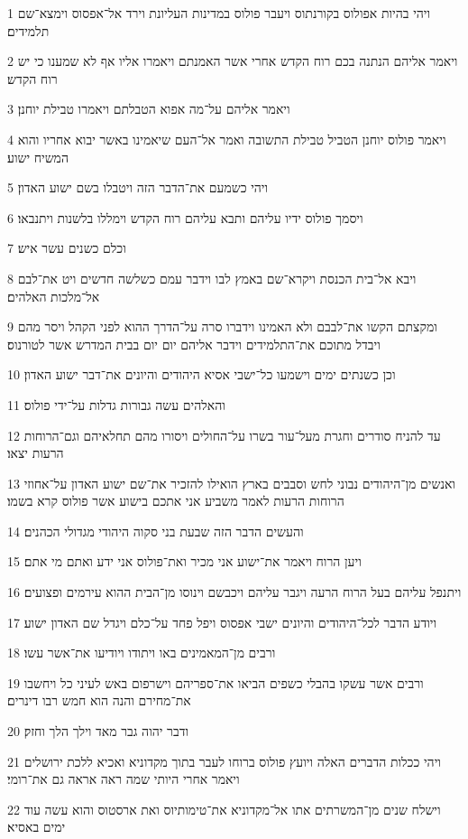 \par 1 ויהי בהיות אפולוס בקורנתוס ויעבר פולוס במדינות העליונת וירד אל־אפסוס וימצא־שם תלמידים׃
\par 2 ויאמר אליהם הנתנה בכם רוח הקדש אחרי אשר האמנתם ויאמרו אליו אף לא שמענו כי יש רוח הקדש׃
\par 3 ויאמר אליהם על־מה אפוא הטבלתם ויאמרו טבילת יוחנן׃
\par 4 ויאמר פולוס יוחנן הטביל טבילת התשובה ואמר אל־העם שיאמינו באשר יבוא אחריו והוא המשיח ישוע׃
\par 5 ויהי כשמעם את־הדבר הזה ויטבלו בשם ישוע האדון׃
\par 6 ויסמך פולוס ידיו עליהם ותבא עליהם רוח הקדש וימללו בלשנות ויתנבאו׃
\par 7 וכלם כשנים עשר איש׃
\par 8 ויבא אל־בית הכנסת ויקרא־שם באמץ לבו וידבר עמם כשלשה חדשים ויט את־לבם אל־מלכות האלהים׃
\par 9 ומקצתם הקשו את־לבבם ולא האמינו וידברו סרה על־הדרך ההוא לפני הקהל ויסר מהם ויבדל מתוכם את־התלמידים וידבר אליהם יום יום בבית המדרש אשר לטורנוס׃
\par 10 וכן כשנתים ימים וישמעו כל־ישבי אסיא היהודים והיונים את־דבר ישוע האדון׃
\par 11 והאלהים עשה גבורות גדלות על־ידי פולוס׃
\par 12 עד להניח סודרים וחגרת מעל־עור בשרו על־החולים ויסורו מהם תחלאיהם וגם־הרוחות הרעות יצאו׃
\par 13 ואנשים מן־היהודים נבוני לחש וסבבים בארץ הואילו להזכיר את־שם ישוע האדון על־אחוזי הרוחות הרעות לאמר משביע אני אתכם בישוע אשר פולוס קרא בשמו׃
\par 14 והעשים הדבר הזה שבעת בני סקוה היהודי מגדולי הכהנים׃
\par 15 ויען הרוח ויאמר את־ישוע אני מכיר ואת־פולוס אני ידע ואתם מי אתם׃
\par 16 ויתנפל עליהם בעל הרוח הרעה ויגבר עליהם ויכבשם וינוסו מן־הבית ההוא עירמים ופצועים׃
\par 17 ויודע הדבר לכל־היהודים והיונים ישבי אפסוס ויפל פחד על־כלם ויגדל שם האדון ישוע׃
\par 18 ורבים מן־המאמינים באו ויתודו ויודיעו את־אשר עשו׃
\par 19 ורבים אשר עשקו בהבלי כשפים הביאו את־ספריהם וישרפום באש לעיני כל ויחשבו את־מחירם והנה הוא חמש רבו דינרים׃
\par 20 ודבר יהוה גבר מאד וילך הלך וחזק׃
\par 21 ויהי ככלות הדברים האלה ויועץ פולוס ברוחו לעבר בתוך מקדוניא ואכיא ללכת ירושלים ויאמר אחרי היותי שמה ראה אראה גם את־רומי׃
\par 22 וישלח שנים מן־המשרתים אתו אל־מקדוניא את־טימותיוס ואת ארסטוס והוא עשה עוד ימים באסיא׃
